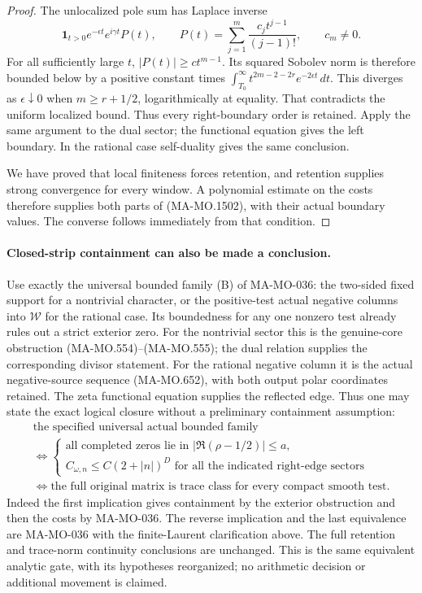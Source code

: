 \begin{proof}
The unlocalized pole sum has Laplace inverse
\[
 \mathbf1_{t>0}e^{-\epsilon t}e^{i\gamma t}P(t),
 \qquad
 P(t)=\sum_{j=1}^m\frac{c_jt^{j-1}}{(j-1)!},
                       \qquad c_m\ne0 .
 \tag{MA-MO.1531}
\]
For all sufficiently large $t$, $|P(t)|\ge c t^{m-1}$.
Its squared Sobolev norm is therefore bounded below by
a positive constant times
$\int_{T_0}^\infty t^{2m-2-2r}e^{-2\epsilon t}\,dt$.
This diverges as $\epsilon\downarrow0$ when
$m\ge r+1/2$, logarithmically at equality.  That contradicts
the uniform localized bound.  Thus every right-boundary
order is retained.  Apply the same argument to the dual
sector; the functional equation gives the left boundary.
In the rational case self-duality gives the same conclusion.

We have proved that local finiteness forces retention,
and retention supplies strong convergence for every window.
A polynomial estimate on the costs therefore supplies both
parts of (MA-MO.1502), with their actual boundary values.
The converse follows immediately from that condition.
\end{proof}

\paragraph{Closed-strip containment can also be made a conclusion.}
Use exactly the universal bounded family (B) of MA-MO-036:
the two-sided fixed support for a nontrivial character, or
the positive-test actual negative columns into $\mathcal W$
for the rational case.  Its boundedness for any one nonzero
test already rules out a strict exterior zero.
For the nontrivial sector this is the genuine-core
obstruction (MA-MO.554)--(MA-MO.555); the dual relation
supplies the corresponding divisor statement.
For the rational negative column it is the actual
negative-source sequence (MA-MO.652), with both output
polar coordinates retained.  The zeta functional equation
supplies the reflected edge.  Thus one may state the exact
logical closure without a preliminary containment assumption:
\[
\begin{gathered}
 \text{the specified universal actual bounded family}\\
 \Longleftrightarrow
 \left\{
 \begin{array}{l}
 \text{all completed zeros lie in }|\Re(\rho-1/2)|\le a,\\
 C_{\omega,n}\le C(2+|n|)^D
                 \text{ for all the indicated right-edge sectors}
 \end{array}\right.\\
 \Longleftrightarrow
 \text{the full original matrix is trace class for every compact
 smooth test}.
\end{gathered}
\tag{MA-MO.1532}
\]
Indeed the first implication gives containment by the
exterior obstruction and then the costs by MA-MO-036.
The reverse implication and the last equivalence are
MA-MO-036 with the finite-Laurent clarification above.
The full retention and trace-norm continuity conclusions
are unchanged.  This is the same equivalent analytic gate,
with its hypotheses reorganized; no arithmetic decision
or additional movement is claimed.

